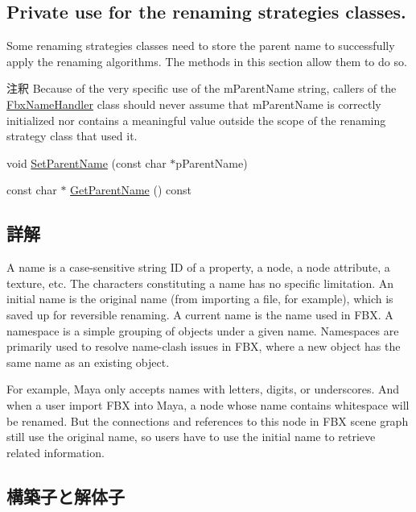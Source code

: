 \subsection*{Private use for the renaming strategies classes.}
\label{_amgrp8fe6d105820914a0c89a4b0c422a569e}%
Some renaming strategies classes need to store the parent name to successfully apply the renaming algorithms. The methods in this section allow them to do so. \begin{DoxyRemark}{注釈}
Because of the very specific use of the m\+Parent\+Name string, callers of the \hyperlink{class_fbx_name_handler}{Fbx\+Name\+Handler} class should never assume that m\+Parent\+Name is correctly initialized nor contains a meaningful value outside the scope of the renaming strategy class that used it. 
\end{DoxyRemark}
\begin{DoxyCompactItemize}
\item 
void \hyperlink{class_fbx_name_handler_a647b1b11442049cebf1e958fcc523608}{Set\+Parent\+Name} (const char $\ast$p\+Parent\+Name)
\item 
const char $\ast$ \hyperlink{class_fbx_name_handler_a81b581d71cce2bc20c51ae16a95a8545}{Get\+Parent\+Name} () const
\end{DoxyCompactItemize}


\subsection{詳解}
A name is a case-\/sensitive string ID of a property, a node, a node attribute, a texture, etc. The characters constituting a name has no specific limitation. An initial name is the original name (from importing a file, for example), which is saved up for reversible renaming. A current name is the name used in F\+BX. A namespace is a simple grouping of objects under a given name. Namespaces are primarily used to resolve name-\/clash issues in F\+BX, where a new object has the same name as an existing object.

For example, Maya only accepts names with letters, digits, or underscores. And when a user import F\+BX into Maya, a node whose name contains whitespace will be renamed. But the connections and references to this node in F\+BX scene graph still use the original name, so users have to use the initial name to retrieve related information. 

\subsection{構築子と解体子}
\mbox{\label{class_fbx_name_handler_a02a3f41e3f5c9ec99c9ae5217ee3eb8b}} 

